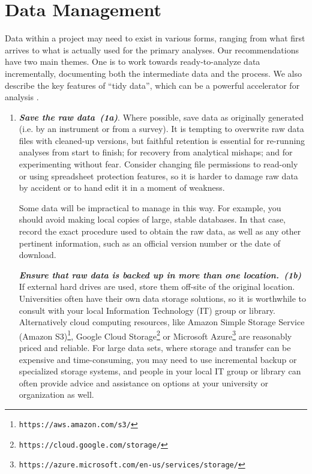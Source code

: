 \documentclass[10pt,letterpaper]{article}
\newcommand{\withurl}[2]{{#1}\footnote{{\texttt{#2}}}}
\newcommand{\practicesection}[2]{\section{#1}\label{#2}}
\newcommand{\practice}[2]{\textbf{\emph{{#2}~({#1})}}}
\begin{document}
\practicesection{Data Management}{sec:data}

Data within a project may need to exist in various forms, ranging from
what first arrives to what is actually used for the primary analyses.
Our recommendations have two main themes. One is to work towards
ready-to-analyze data incrementally, documenting both the intermediate
data and the process. We also describe the key features of ``tidy
data'', which can be a powerful accelerator for analysis
\cite{wickham2014,hart2016}.

\begin{enumerate}

\item

  \practice{1a}{Save the raw data}.  Where possible, save data as
  originally generated (i.e. by an instrument or from a survey).  It
  is tempting to overwrite raw data files with cleaned-up versions,
  but faithful retention is essential for re-running analyses from
  start to finish; for recovery from analytical mishaps; and for
  experimenting without fear. Consider changing file permissions to
  read-only or using spreadsheet protection features, so it is harder
  to damage raw data by accident or to hand edit it in a moment of
  weakness.

  Some data will be impractical to manage in this way. For example,
  you should avoid making local copies of large, stable databases.  In
  that case, record the exact procedure used to obtain the raw data,
  as well as any other pertinent information, such as an official
  version number or the date of download.
  
  \practice{1b}{Ensure that raw data is backed up in more than one
  location.} If external hard drives are used, store them off-site
  of the original location. Universities often have their own data
  storage solutions, so it is worthwhile to consult with your local
  Information Technology (IT) group or library.  Alternatively cloud
  computing resources, like  \withurl{Amazon Simple Storage Service 
  (Amazon S3)}{https://aws.amazon.com/s3/}, 
  \withurl{Google Cloud Storage}{https://cloud.google.com/storage/}
  or \withurl{Microsoft Azure}
  {https://azure.microsoft.com/en-us/services/storage/}
  are reasonably priced and reliable.
  For large data sets, where storage and transfer can be
  expensive and time-consuming, you may need to use incremental backup
  or specialized storage systems, and people in your local IT group or
  library can often provide advice and assistance on options at your
  university or organization as well.


\end{enumerate}
\end{document}
